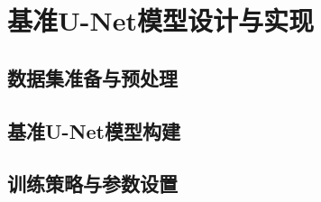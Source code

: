\section{基准U-Net模型设计与实现}

\subsection{数据集准备与预处理}


\subsection{基准U-Net模型构建}


\subsection{训练策略与参数设置}
